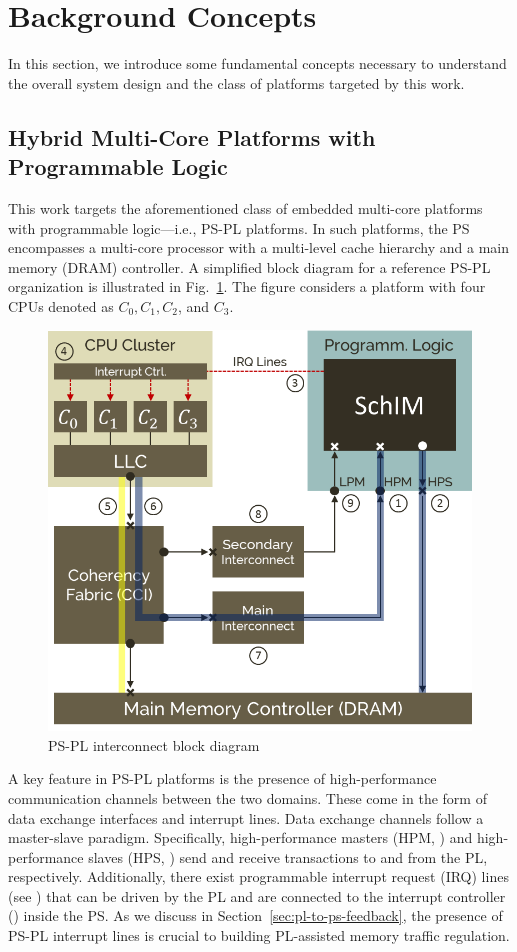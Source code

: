 \section{Background Concepts}

In this section, we introduce some fundamental concepts necessary to
understand the overall system design and the class of platforms
targeted by this work.

\subsection{Hybrid Multi-Core Platforms with Programmable Logic}
This work targets the aforementioned class of embedded multi-core
platforms with programmable logic---i.e., PS-PL platforms. In such
platforms, the PS encompasses a multi-core processor with a
multi-level cache hierarchy and a main memory (DRAM) controller.  A
simplified block diagram for a reference PS-PL organization is
illustrated in Fig.~\ref{fig:PS-PL-diagram}. The figure considers a
platform with four CPUs denoted as $C_0, C_1, C_2$, and $C_3$.

\begin{figure}[t]
  \centering
  \includegraphics[width=0.9\linewidth]{images/system_blocks.png}
  \caption{PS-PL interconnect block diagram}
  \label{fig:PS-PL-diagram}
\end{figure}

A key feature in PS-PL platforms is the presence of high-performance
communication channels between the two domains. These come in the form
of data exchange interfaces and interrupt lines. Data exchange
channels follow a master-slave paradigm. Specifically,
high-performance masters (HPM, ) and
high-performance slaves (HPS, ) send
and receive transactions to and from the PL,
respectively. Additionally, there exist programmable interrupt request
(IRQ) lines (see ) that can be driven
by the PL and are connected to the interrupt controller
() inside the PS. As we discuss in
Section~\ref{sec:pl-to-ps-feedback}, the presence of PS-PL interrupt
lines is crucial to building PL-assisted memory traffic regulation.

